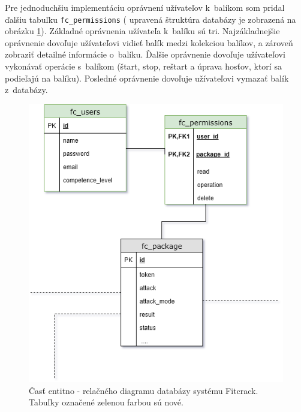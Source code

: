 \documentclass[../projekt.tex]{subfiles}
\begin{document}
Pre jednoduchšiu implementáciu oprávnení užívateľov k~balíkom som pridal ďalšiu tabuľku \texttt{fc\_permissions} ( upravená štruktúra databázy je zobrazená na obrázku \ref{fig:db}). Základné oprávnenia užívateľa k~balíku sú tri. Najzákladnejšie oprávnenie dovoľuje užívateľovi vidieť balík medzi kolekciou balíkov, a zároveň zobraziť detailné informácie o~balíku. Ďalšie oprávnenie dovoľuje užívateľovi vykonávať operácie s~balíkom (štart, stop, reštart a úprava hosťov, ktorí sa podieľajú na balíku). Posledné oprávnenie dovoľuje užívateľovi vymazať balík z~databázy.

\begin{figure}[h]
    \centering
    \label{fig:db}
    \includegraphics[scale=0.6]{obrazky/users.png}
    \caption{Časť entitno - relačného diagramu databázy systému Fitcrack. Tabuľky označené zelenou farbou sú nové.}
\end{figure}
\end{document}
